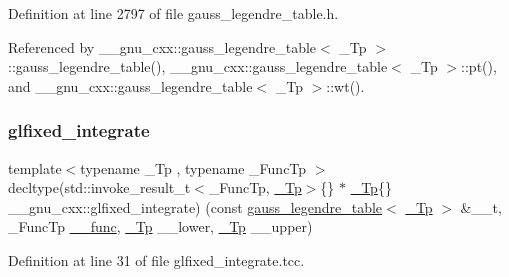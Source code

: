 Definition at line 2797 of file gauss\+\_\+legendre\+\_\+table.\+h.



Referenced by \+\_\+\+\_\+gnu\+\_\+cxx\+::gauss\+\_\+legendre\+\_\+table$<$ \+\_\+\+Tp $>$\+::gauss\+\_\+legendre\+\_\+table(), \+\_\+\+\_\+gnu\+\_\+cxx\+::gauss\+\_\+legendre\+\_\+table$<$ \+\_\+\+Tp $>$\+::pt(), and \+\_\+\+\_\+gnu\+\_\+cxx\+::gauss\+\_\+legendre\+\_\+table$<$ \+\_\+\+Tp $>$\+::wt().

\mbox{\label{namespace____gnu__cxx_a5fca3754ea9feb1fb2448da7df080ef6}} 
\subsubsection{\texorpdfstring{glfixed\+\_\+integrate}{glfixed\_integrate}}
{\footnotesize\ttfamily template$<$typename \+\_\+\+Tp , typename \+\_\+\+Func\+Tp $>$ \\
decltype(std\+::invoke\+\_\+result\+\_\+t$<$\+\_\+\+Func\+Tp, \hyperlink{namespace____gnu__cxx_a3b19a9c800ca194374ef9172290f7d79}{\+\_\+\+Tp}$>$\{\} $\ast$ \hyperlink{namespace____gnu__cxx_a3b19a9c800ca194374ef9172290f7d79}{\+\_\+\+Tp}\{\} \+\_\+\+\_\+gnu\+\_\+cxx\+::glfixed\+\_\+integrate) (const \hyperlink{struct____gnu__cxx_1_1gauss__legendre__table}{gauss\+\_\+legendre\+\_\+table}$<$ \hyperlink{namespace____gnu__cxx_a3b19a9c800ca194374ef9172290f7d79}{\+\_\+\+Tp} $>$ \&\+\_\+\+\_\+t, \+\_\+\+Func\+Tp \hyperlink{namespace____gnu__cxx_af2b2f0c7a2ae72b922b1afefae5a65b2}{\+\_\+\+\_\+func}, \hyperlink{namespace____gnu__cxx_a3b19a9c800ca194374ef9172290f7d79}{\+\_\+\+Tp} \+\_\+\+\_\+lower, \hyperlink{namespace____gnu__cxx_a3b19a9c800ca194374ef9172290f7d79}{\+\_\+\+Tp} \+\_\+\+\_\+upper)}



Definition at line 31 of file glfixed\+\_\+integrate.\+tcc.


